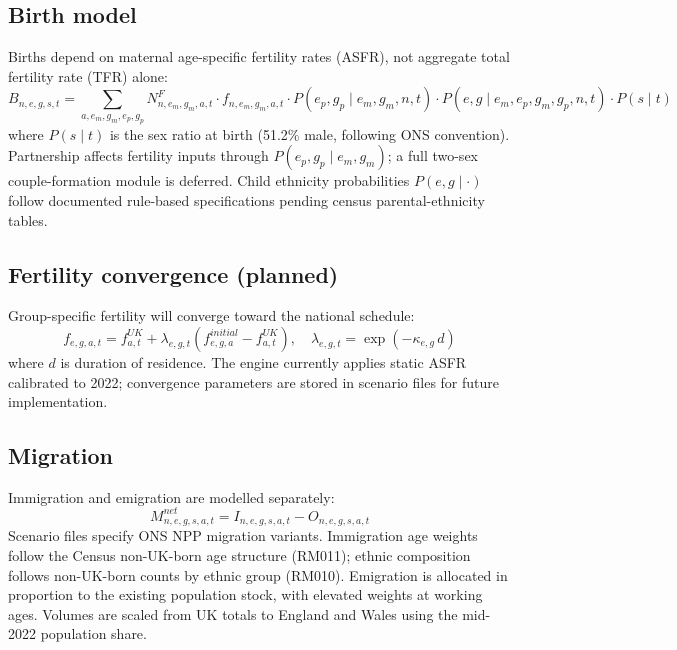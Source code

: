 \documentclass[12pt,a4paper]{article}
\begin{document}
\subsection{Birth model}

Births depend on maternal age-specific fertility rates (ASFR), not aggregate total fertility
rate (TFR) alone:
\begin{equation}
    B_{n,e,g,s,t} = \sum_{a, e_m, g_m, e_p, g_p} N^{F}_{n,e_m,g_m,a,t} \cdot f_{n,e_m,g_m,a,t} \cdot P(e_p, g_p \mid e_m, g_m, n, t) \cdot P(e, g \mid e_m, e_p, g_m, g_p, n, t) \cdot P(s \mid t)
    \label{eq:births}
\end{equation}
where $P(s \mid t)$ is the sex ratio at birth (51.2\% male, following ONS convention).
Partnership affects fertility inputs through $P(e_p, g_p \mid e_m, g_m)$; a full two-sex
couple-formation module is deferred. Child ethnicity probabilities $P(e, g \mid \cdot)$ follow
documented rule-based specifications pending census parental-ethnicity tables.

\subsection{Fertility convergence (planned)}

Group-specific fertility will converge toward the national schedule:
\begin{equation}
    f_{e,g,a,t} = f^{UK}_{a,t} + \lambda_{e,g,t}\left(f^{initial}_{e,g,a} - f^{UK}_{a,t}\right), \quad \lambda_{e,g,t} = \exp(-\kappa_{e,g}\, d)
    \label{eq:convergence}
\end{equation}
where $d$ is duration of residence. The engine currently applies static ASFR calibrated to
2022; convergence parameters are stored in scenario files for future implementation.

\subsection{Migration}

Immigration and emigration are modelled separately:
\begin{equation}
    M^{net}_{n,e,g,s,a,t} = I_{n,e,g,s,a,t} - O_{n,e,g,s,a,t}
    \label{eq:netmigration}
\end{equation}
Scenario files specify ONS NPP migration variants. Immigration age weights follow the
Census non-UK-born age structure (RM011); ethnic composition follows non-UK-born counts by
ethnic group (RM010). Emigration is allocated in proportion to the existing population stock,
with elevated weights at working ages. Volumes are scaled from UK totals to England and
Wales using the mid-2022 population share.
\end{document}
